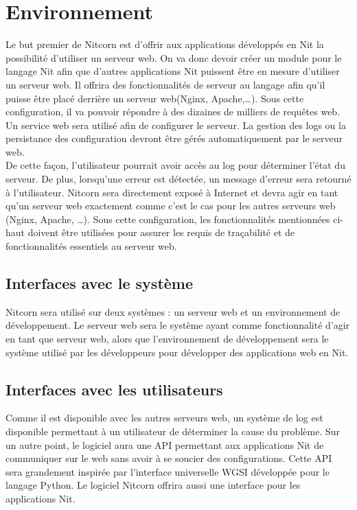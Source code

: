 \documentclass{scrreprt}
\begin{document}
\section{Environnement}
Le but premier de Nitcorn est d'offrir aux applications développés en Nit la possibilité
d'utiliser un serveur web. On va donc devoir créer un module pour le langage Nit afin que d'autres applications Nit puissent être en mesure d'utiliser un serveur web. Il offrira des fonctionnalités de serveur au langage afin qu'il puisse être placé derrière un serveur web(Nginx, Apache,\ldots). Sous cette configuration, il va pouvoir répondre à des dizaines de milliers de requêtes web. Un service web sera utilisé afin de configurer le serveur. La gestion des logs ou la persistance des configuration devront être gérés automatiquement par le serveur web.\\ De cette façon, l'utilisateur pourrait avoir accès au log pour déterminer l'état du serveur. De plus, lorsqu'une erreur est détectée, un message d'erreur sera retourné à l'utilisateur. Nitcorn sera directement exposé à Internet et devra agir en tant qu'un serveur web exactement comme c'est le cas pour les autres
serveurs web (Nginx, Apache, \ldots). Sous cette configuration, les
fonctionnalités mentionnées ci-haut doivent être utilisées pour assurer les requis de traçabilité
et de fonctionnalités essentiels au serveur web.

\subsection{Interfaces avec le système}
Nitcorn sera utilisé sur deux systèmes : un serveur web et un environnement de développement.
Le serveur web sera le système ayant comme fonctionnalité d'agir en tant que serveur web, alors
que l'environnement de développement sera le système utilisé par les développeurs
pour développer des applications web en Nit.

\subsection{Interfaces avec les utilisateurs}
Comme il est disponible avec les autres serveurs web, un système de log est
disponible permettant à un utilisateur de déterminer la cause du problème. Sur
un autre point, le logiciel aura une API permettant aux applications Nit de
communiquer sur le web sans avoir à se soucier des configurations. Cette
API sera grandement inspirée par l'interface universelle WGSI développée pour
le langage Python. Le logiciel Nitcorn offrira aussi une interface pour les
applications Nit.
\end{document}
